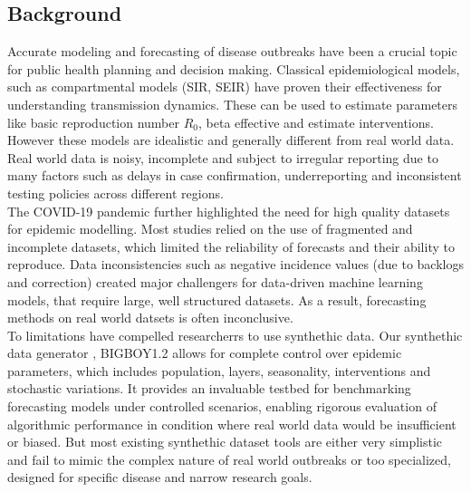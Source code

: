 \documentclass[11pt,a4paper]{article}
\theoremstyle{remark}\newtheorem{remark}{Remark}
\begin{document}
\subsection{Background}
Accurate modeling and forecasting of disease outbreaks have been a crucial topic for public health planning and decision making. Classical epidemiological models, such as compartmental models (SIR, SEIR) have proven their effectiveness for understanding transmission dynamics. These can be used to estimate parameters like basic reproduction number $R_0$, beta effective and estimate interventions. However these models are idealistic and generally different from real world data. Real world data is noisy, incomplete and subject to irregular reporting due to many factors such as delays in case confirmation, underreporting and inconsistent testing policies across different regions. \\
The COVID-19 pandemic further highlighted the need for high quality datasets for epidemic modelling. Most studies relied on the use of fragmented and incomplete datasets, which limited the reliability of forecasts and their ability to reproduce. Data inconsistencies such as negative incidence values (due to backlogs and correction) created major challengers for data-driven machine learning models, that require large, well structured datasets. As a result, forecasting methods on real world datsets is often inconclusive. \\
To limitations have compelled researcherrs to use synthethic data. Our synthethic data generator , BIGBOY1.2 allows for complete control over epidemic parameters, which includes population, layers, seasonality, interventions and stochastic variations. It provides an invaluable testbed for benchmarking forecasting models under controlled scenarios, enabling rigorous evaluation of algorithmic performance in condition where real world data would be insufficient or biased. But most existing synthethic dataset tools are either very simplistic and fail to mimic the complex nature of real world outbreaks or too specialized, designed for specific disease and narrow research goals.
\end{document}
